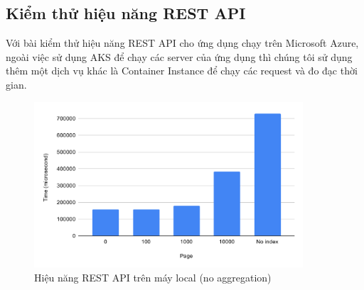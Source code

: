 \subsection{Kiểm thử hiệu năng REST API}
Với bài kiểm thử hiệu năng REST API cho ứng dụng chạy trên
Microsoft Azure, ngoài việc sử dụng AKS để chạy các server
của ứng dụng thì chúng tôi sử dụng thêm một dịch vụ
khác là Container Instance để chạy các request và đo
đạc thời gian.
\begin{figure}[H]
\centering
\includegraphics[width=10cm]{images/testing/view-local.png}
\caption{Hiệu năng REST API trên máy local (no aggregation)}
\end{figure}

